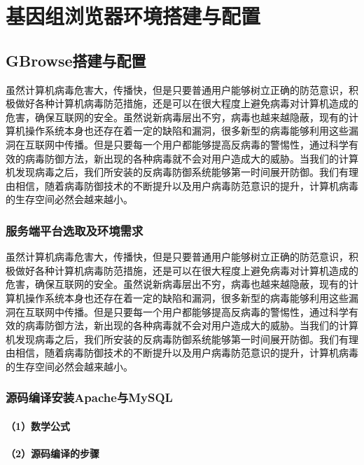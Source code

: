 \chapter{基因组浏览器环境搭建与配置}
	\section{GBrowse搭建与配置}
	虽然计算机病毒危害大，传播快，但是只要普通用户能够树立正确的防范意识，积极做好各种计算机病毒防范措施，还是可以在很大程度上避免病毒对计算机造成的危害，确保互联网的安全。虽然说新病毒层出不穷，病毒也越来越隐蔽，现有的计算机操作系统本身也还存在着一定的缺陷和漏洞，很多新型的病毒能够利用这些漏洞在互联网中传播。但是只要每一个用户都能够提高反病毒的警惕性，通过科学有效的病毒防御方法，新出现的各种病毒就不会对用户造成大的威胁。当我们的计算机发现病毒之后，我们所安装的反病毒防御系统能够第一时间展开防御。我们有理由相信，随着病毒防御技术的不断提升以及用户病毒防范意识的提升，计算机病毒的生存空间必然会越来越小。
	\subsection{服务端平台选取及环境需求}
	虽然计算机病毒危害大，传播快，但是只要普通用户能够树立正确的防范意识，积极做好各种计算机病毒防范措施，还是可以在很大程度上避免病毒对计算机造成的危害，确保互联网的安全。虽然说新病毒层出不穷，病毒也越来越隐蔽，现有的计算机操作系统本身也还存在着一定的缺陷和漏洞，很多新型的病毒能够利用这些漏洞在互联网中传播。但是只要每一个用户都能够提高反病毒的警惕性，通过科学有效的病毒防御方法，新出现的各种病毒就不会对用户造成大的威胁。当我们的计算机发现病毒之后，我们所安装的反病毒防御系统能够第一时间展开防御。我们有理由相信，随着病毒防御技术的不断提升以及用户病毒防范意识的提升，计算机病毒的生存空间必然会越来越小。
	\subsection{源码编译安装Apache与MySQL}
		\subsubsection{（1）数学公式}
		
		\subsubsection{（2）源码编译的步骤}
		
